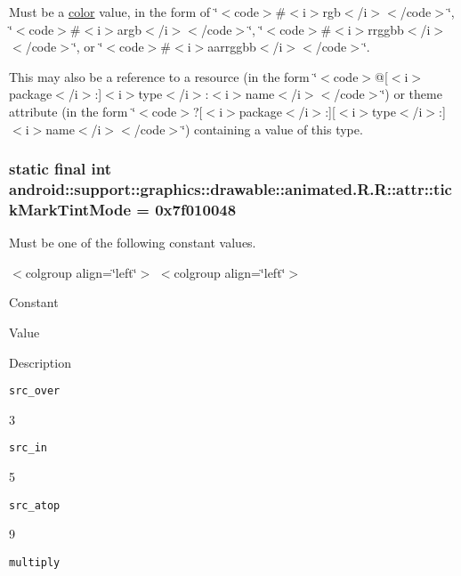 Must be a \hyperlink{classandroid_1_1support_1_1graphics_1_1drawable_1_1animated_1_1_r_1_1color}{color} value, in the form of \char`\"{}$<$code$>$\#$<$i$>$rgb$<$/i$>$$<$/code$>$\char`\"{}, \char`\"{}$<$code$>$\#$<$i$>$argb$<$/i$>$$<$/code$>$\char`\"{}, \char`\"{}$<$code$>$\#$<$i$>$rrggbb$<$/i$>$$<$/code$>$\char`\"{}, or \char`\"{}$<$code$>$\#$<$i$>$aarrggbb$<$/i$>$$<$/code$>$\char`\"{}. 

This may also be a reference to a resource (in the form \char`\"{}$<$code$>$@\mbox{[}$<$i$>$package$<$/i$>$:\mbox{]}$<$i$>$type$<$/i$>$:$<$i$>$name$<$/i$>$$<$/code$>$\char`\"{}) or theme attribute (in the form \char`\"{}$<$code$>$?\mbox{[}$<$i$>$package$<$/i$>$:\mbox{]}\mbox{[}$<$i$>$type$<$/i$>$:\mbox{]}$<$i$>$name$<$/i$>$$<$/code$>$\char`\"{}) containing a value of this type. \hypertarget{classandroid_1_1support_1_1graphics_1_1drawable_1_1animated_1_1_r_1_1attr_7c8df95369dd034310651f9fa2acacd1}{
\subsubsection[{tickMarkTintMode}]{\setlength{\rightskip}{0pt plus 5cm}static final int android::support::graphics::drawable::animated.R.R::attr::tickMarkTintMode = 0x7f010048}}
\label{classandroid_1_1support_1_1graphics_1_1drawable_1_1animated_1_1_r_1_1attr_7c8df95369dd034310651f9fa2acacd1}


Must be one of the following constant values. \begin{TabularC}{0}
\hline
\end{TabularC}
$<$colgroup align=\char`\"{}left\char`\"{}$>$ $<$colgroup align=\char`\"{}left\char`\"{}$>$ 

Constant

Value

Description 

{\tt src\_\-over}

3

{\tt src\_\-in}

5

{\tt src\_\-atop}

9

{\tt multiply}

